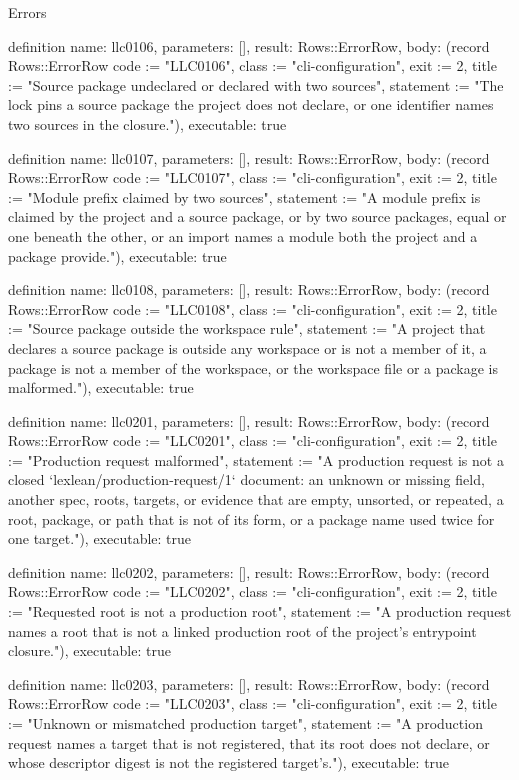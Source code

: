 \begin{lexlean}{Errors}
\begin{semanticmodule}
definition{
  name: llc0106,
  parameters: [],
  result: Rows::ErrorRow,
  body: (record Rows::ErrorRow {code := "LLC0106", class := "cli-configuration", exit := 2, title := "Source package undeclared or declared with two sources", statement := "The lock pins a source package the project does not declare, or one identifier names two sources in the closure."}),
  executable: true
}

definition{
  name: llc0107,
  parameters: [],
  result: Rows::ErrorRow,
  body: (record Rows::ErrorRow {code := "LLC0107", class := "cli-configuration", exit := 2, title := "Module prefix claimed by two sources", statement := "A module prefix is claimed by the project and a source package, or by two source packages, equal or one beneath the other, or an import names a module both the project and a package provide."}),
  executable: true
}

definition{
  name: llc0108,
  parameters: [],
  result: Rows::ErrorRow,
  body: (record Rows::ErrorRow {code := "LLC0108", class := "cli-configuration", exit := 2, title := "Source package outside the workspace rule", statement := "A project that declares a source package is outside any workspace or is not a member of it, a package is not a member of the workspace, or the workspace file or a package is malformed."}),
  executable: true
}

definition{
  name: llc0201,
  parameters: [],
  result: Rows::ErrorRow,
  body: (record Rows::ErrorRow {code := "LLC0201", class := "cli-configuration", exit := 2, title := "Production request malformed", statement := "A production request is not a closed `lexlean/production-request/1` document: an unknown or missing field, another spec, roots, targets, or evidence that are empty, unsorted, or repeated, a root, package, or path that is not of its form, or a package name used twice for one target."}),
  executable: true
}

definition{
  name: llc0202,
  parameters: [],
  result: Rows::ErrorRow,
  body: (record Rows::ErrorRow {code := "LLC0202", class := "cli-configuration", exit := 2, title := "Requested root is not a production root", statement := "A production request names a root that is not a linked production root of the project's entrypoint closure."}),
  executable: true
}

definition{
  name: llc0203,
  parameters: [],
  result: Rows::ErrorRow,
  body: (record Rows::ErrorRow {code := "LLC0203", class := "cli-configuration", exit := 2, title := "Unknown or mismatched production target", statement := "A production request names a target that is not registered, that its root does not declare, or whose descriptor digest is not the registered target's."}),
  executable: true
}


\end{semanticmodule}
\end{lexlean}
